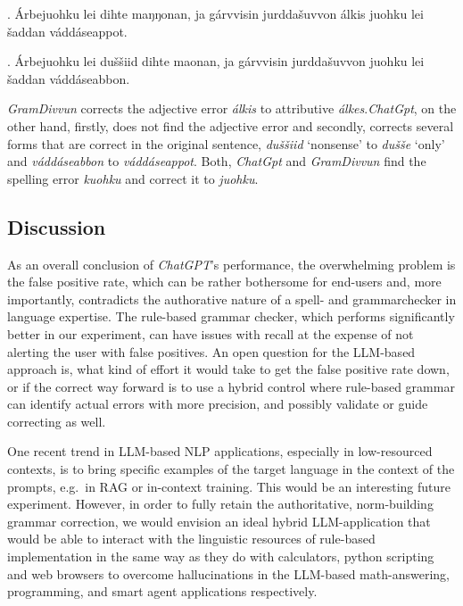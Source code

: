 \documentclass[free]{flammie}
\newcommand\gecfail{\bgroup\markoverwith%
{\textcolor{blue}{\lower3.5pt\hbox{\sixly{}\char58}}}\ULon}
\begin{document}
\begin{tcolorbox}[colframe=black, colback=samired, arc=2mm]
    \ex. Árbejuohku lei \gecfail{dušše} dihte
    \selectfont maŋŋonan, ja gárvvisin jurd­dašuvvon álkis
    juohku lei šaddan váddáseappot.\label{arbejuohku-gpt}

\end{tcolorbox}

\begin{tcolorbox}[colframe=black, colback=divvungreen!90!black, arc=2mm]
    \ex. Árbejuohku lei duššiid dihte \selectfont
    ma\ng\ng{}onan, ja gárvvisin jurd­dašuvvon \gecfail{álkes}
    juohku lei šaddan váddáseabbon.\label{arbejuohku-gd}

\end{tcolorbox}

\textit{GramDivvun} corrects the adjective error \textit{álkis} to attributive
\textit{álkes}.\@ \textit{ChatGpt}, on the other hand, firstly, does not find the
adjective error and secondly, corrects several forms that are correct in the
original sentence, \textit{duššiid} `nonsense' to \textit{dušše} `only' and
\textit{váddáseabbon} to \textit{váddáseappot}.  Both, \textit{ChatGpt} and
\textit{GramDivvun} find the spelling error \textit{kuohku} and correct it to
\textit{juohku}.




\subsection{Discussion}

As an overall conclusion of \textit{ChatGPT}'s performance, the overwhelming
problem is the false positive rate, which can be rather bothersome for end-users
and, more importantly, contradicts the authorative nature of a spell- and
grammarchecker in language expertise. The rule-based grammar checker, which
performs significantly better in our experiment, can have issues with recall at
the expense of not alerting the user with false positives. An open question for
the LLM-based approach is, what kind of effort it would take to get the false
positive rate down, or if the correct way forward is to use a hybrid control
where rule-based grammar can identify actual errors with more precision, and
possibly validate or guide correcting as well.

One recent trend in LLM-based NLP applications, especially in low-resourced
contexts, is to bring specific examples of the target language in the context of
the prompts, e.g.\ in RAG or in-context training. This would be an interesting
future experiment. However, in order to fully retain the authoritative,
norm-building grammar correction, we would envision an ideal hybrid
LLM-application that would be able to interact with the linguistic resources of
rule-based implementation in the same way as they do with calculators, python
scripting and web browsers to overcome hallucinations in the LLM-based
math-answering, programming, and smart agent applications respectively.
\end{document}
